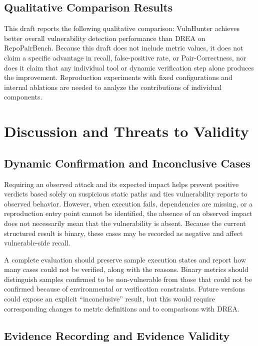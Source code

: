 \documentclass[10pt,a4paper]{article}
\begin{document}
\subsection{Qualitative Comparison Results}

This draft reports the following qualitative comparison: VulnHunter achieves better overall vulnerability detection performance than DREA on RepoPairBench. Because this draft does not include metric values, it does not claim a specific advantage in recall, false-positive rate, or Pair-Correctness, nor does it claim that any individual tool or dynamic verification step alone produces the improvement. Reproduction experiments with fixed configurations and internal ablations are needed to analyze the contributions of individual components.

\section{Discussion and Threats to Validity}

\subsection{Dynamic Confirmation and Inconclusive Cases}

Requiring an observed attack and its expected impact helps prevent positive verdicts based solely on suspicious static paths and ties vulnerability reports to observed behavior. However, when execution fails, dependencies are missing, or a reproduction entry point cannot be identified, the absence of an observed impact does not necessarily mean that the vulnerability is absent. Because the current structured result is binary, these cases may be recorded as negative and affect vulnerable-side recall.

A complete evaluation should preserve sample execution states and report how many cases could not be verified, along with the reasons. Binary metrics should distinguish samples confirmed to be non-vulnerable from those that could not be confirmed because of environmental or verification constraints. Future versions could expose an explicit ``inconclusive'' result, but this would require corresponding changes to metric definitions and to comparisons with DREA.

\subsection{Evidence Recording and Evidence Validity}
\end{document}
